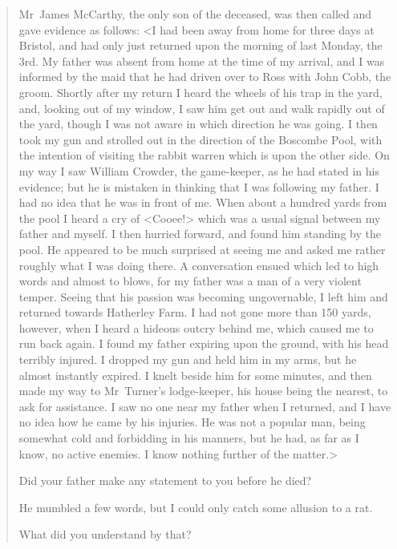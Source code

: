 \begin{quotation}

Mr~James McCarthy, the only son of the deceased, was then called and gave evidence as follows: <I had been away from home for three days at Bristol, and had only just returned upon the morning of last Monday, the 3rd. My father was absent from home at the time of my arrival, and I was informed by the maid that he had driven over to Ross with John Cobb, the groom. Shortly after my return I heard the wheels of his trap in the yard, and, looking out of my window, I saw him get out and walk rapidly out of the yard, though I was not aware in which direction he was going. I then took my gun and strolled out in the direction of the Boscombe Pool, with the intention of visiting the rabbit warren which is upon the other side. On my way I saw William Crowder, the game-keeper, as he had stated in his evidence; but he is mistaken in thinking that I was following my father. I had no idea that he was in front of me. When about a hundred yards from the pool I heard a cry of <Cooee!> which was a usual signal between my father and myself. I then hurried forward, and found him standing by the pool. He appeared to be much surprised at seeing me and asked me rather roughly what I was doing there. A conversation ensued which led to high words and almost to blows, for my father was a man of a very violent temper. Seeing that his passion was becoming ungovernable, I left him and returned towards Hatherley Farm. I had not gone more than 150 yards, however, when I heard a hideous outcry behind me, which caused me to run back again. I found my father expiring upon the ground, with his head terribly injured. I dropped my gun and held him in my arms, but he almost instantly expired. I knelt beside him for some minutes, and then made my way to Mr~Turner's lodge-keeper, his house being the nearest, to ask for assistance. I saw no one near my father when I returned, and I have no idea how he came by his injuries. He was not a popular man, being somewhat cold and forbidding in his manners, but he had, as far as I know, no active enemies. I know nothing further of the matter.>

\begin{dialogue}
 Did your father make any statement to you before he died?

 He mumbled a few words, but I could only catch some allusion to a rat.

 What did you understand by that?


\end{dialogue}
\end{quotation}
